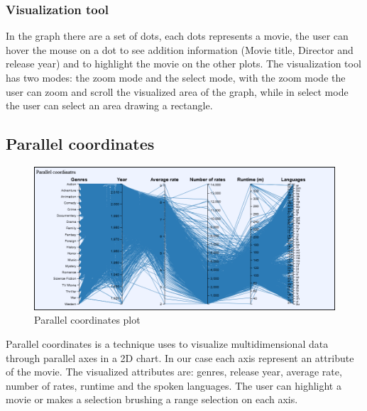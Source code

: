 \documentclass[]{article}
\begin{document}
\subsubsection{Visualization tool}
In the graph there are a set of dots, each dots represents a movie, the user can hover the mouse on a dot to see addition information (Movie title, Director and release year) and to highlight the movie on the other plots.\newline
The visualization tool has two modes: the zoom mode and the select mode, with the zoom mode the user can zoom and scroll the visualized area of the graph, while in select mode the user can select an area drawing a rectangle.
\subsection{Parallel coordinates}
\begin{figure}[H]
	\centering
	\includegraphics[width=1\linewidth]{images/parallel_plot}
	\caption{Parallel coordinates plot}
	\label{fig:parallelplot}
\end{figure}
Parallel coordinates is a technique uses to visualize multidimensional data through parallel axes in a 2D chart. In our case each axis represent an attribute of the movie.\newline
The visualized attributes are: genres, release year, average rate, number of rates, runtime and the spoken languages.\newline
The user can highlight a movie or makes a selection brushing a range selection on each axis.
\end{document}
